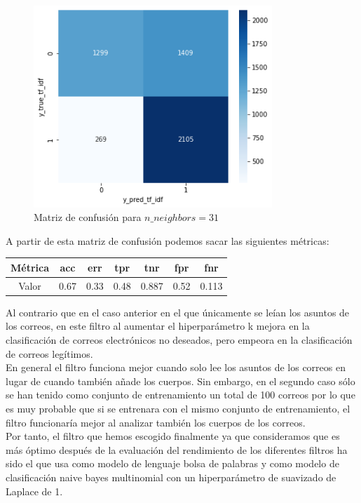 \documentclass[conference,a4paper]{IEEEtran}
\begin{document}
\begin{figure}[h]
  \centering
  \includegraphics[width=90mm]{knn_body_31}
  \caption{Matriz de confusión para $n\_neighbors=31$}
  \label{fig:ejemplo}
\end{figure}

A partir de esta matriz de confusión podemos sacar las siguientes métricas:

\begin{center}
\begin{tabular}[h]{ |c|c|c|c|c|c|c| } 
 \hline
 Métrica & acc & err & tpr & tnr & fpr & fnr \\ 
 \hline
 Valor & 0.67 & 0.33 & 0.48 & 0.887 & 0.52 & 0.113 \\ 
 \hline
\end{tabular}
\end{center}

Al contrario que en el caso anterior en el que únicamente se leían los asuntos de los correos, en este filtro al aumentar el hiperparámetro k mejora en la clasificación de correos electrónicos no deseados, pero empeora en la clasificación de correos legítimos. \\

En general el filtro funciona mejor cuando solo lee los asuntos de los correos en lugar de cuando también añade los cuerpos. Sin embargo, en el segundo caso sólo se han tenido como conjunto de entrenamiento un total de 100 correos por lo que es muy probable que si se entrenara con el mismo conjunto de entrenamiento, el filtro funcionaría mejor al analizar también los cuerpos de los correos. \\

Por tanto, el filtro que hemos escogido finalmente ya que consideramos que es más óptimo después de la evaluación del rendimiento de los diferentes filtros ha sido el que usa como modelo de lenguaje bolsa de palabras y como modelo de clasificación naive bayes multinomial con un hiperparámetro de suavizado de Laplace de 1. \\
\end{document}
